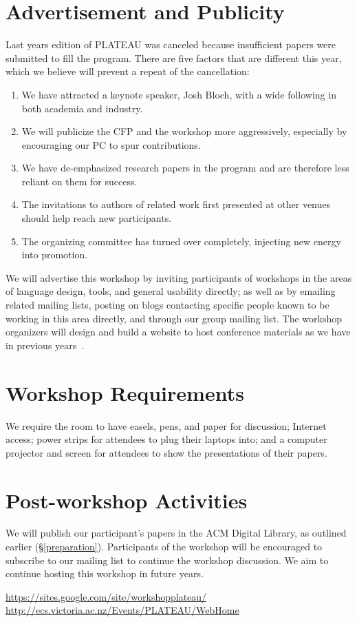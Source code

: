 \documentclass{sigplanconf}
\begin{document}
\section{Advertisement and Publicity}

Last years edition of PLATEAU was canceled because insufficient papers were submitted to fill the program. There are five factors that are different this year, which we believe will prevent a repeat of the cancellation:
\begin{enumerate}
\item We have attracted a keynote speaker, Josh Bloch, with a wide following in both academia and industry. 
\item We will publicize the CFP and the workshop more aggressively, especially by encouraging our PC to spur contributions. 
\item We have de-emphasized research papers in the program and are therefore less reliant on them for success. 
\item The invitations to authors of related work first presented at other venues should help reach new participants. 
\item The organizing committee has turned over completely, injecting new energy into promotion.
\end{enumerate}

We will advertise this workshop by inviting participants of workshops
in the areas of language design, tools, and general usability
directly; as well as by emailing related mailing lists, posting on
blogs contacting specific people known to be working in this area directly,
and through our group mailing list. The workshop organizers will design and build a website to host conference materials as we have in previous years~\cite{website-sites,website-vuw}.

\section{Workshop Requirements}

We require the room to have easels, pens, and paper for discussion; 
Internet access; power strips for attendees to plug their laptops into; and a computer projector and
screen for attendees to show the presentations of their
papers.


\section{Post-workshop Activities}

We will publish our participant's papers in the ACM Digital Library, as outlined earlier (\S \ref{preparation}). Participants of the workshop will be encouraged to subscribe to our mailing list to continue the workshop discussion. We aim to continue hosting this workshop in future years.

\begin{thebibliography}{1}
 \url{https://sites.google.com/site/workshopplateau/}
\url{http://ecs.victoria.ac.nz/Events/PLATEAU/WebHome}
\end{thebibliography}
\end{document}
